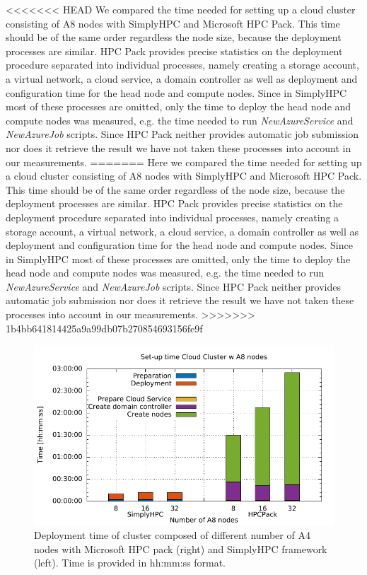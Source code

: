 \documentclass[3p,times]{elsarticle}
\begin{document}
<<<<<<< HEAD
We compared the time needed for setting up a cloud cluster consisting of A8 nodes with SimplyHPC and Microsoft HPC Pack. This time should be of the same order regardless the node size, because the deployment processes are similar. HPC Pack provides precise statistics on the deployment procedure separated into individual processes, namely creating a storage account, a virtual network, a cloud service, a domain controller as well as deployment and configuration time for the head node and compute nodes. Since in SimplyHPC most of these processes are omitted, only the time to deploy the head node and compute nodes was measured, e.g. the time needed to run \textit{NewAzureService} and \textit{NewAzureJob} scripts. Since HPC Pack neither provides automatic job submission nor does it retrieve the result we have not taken these processes into account in our measurements. 
=======
Here we compared the time needed for setting up a cloud cluster consisting of A8 nodes with SimplyHPC and Microsoft HPC Pack. This time should be of the same order regardless of the node size, because the deployment processes are similar. HPC Pack provides precise statistics on the deployment procedure separated into individual processes, namely creating a storage account, a virtual network, a cloud service, a domain controller as well as deployment and configuration time for the head node and compute nodes. Since in SimplyHPC most of these processes are omitted, only the time to deploy the head node and compute nodes was measured, e.g. the time needed to run \textit{NewAzureService} and \textit{NewAzureJob} scripts. Since HPC Pack neither provides automatic job submission nor does it retrieve the result we have not taken these processes into account in our measurements. 
>>>>>>> 1b4bb641814425a9a99db07b270854693156fe9f


\begin{figure}[h]
\centering
	\includegraphics[width=.6\linewidth]{gplt-creation-simplyvshpc}
	\caption{Deployment time of cluster composed of different number of A4 nodes with Microsoft HPC pack (right) and SimplyHPC framework (left). Time is provided in hh:mm:ss format.}
	\label{fig:deployTime}
\end{figure}
\end{document}
